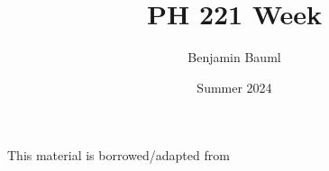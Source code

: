 \documentclass[]{article}
\title{PH 221 Week \Week}
\author{Benjamin Bauml}
\date{Summer 2024}
\newcommand{\FileDepth}{../../..}
\begin{document}
\maketitle
\begin{center}
	This material is borrowed/adapted from
\end{center}







\end{document}
